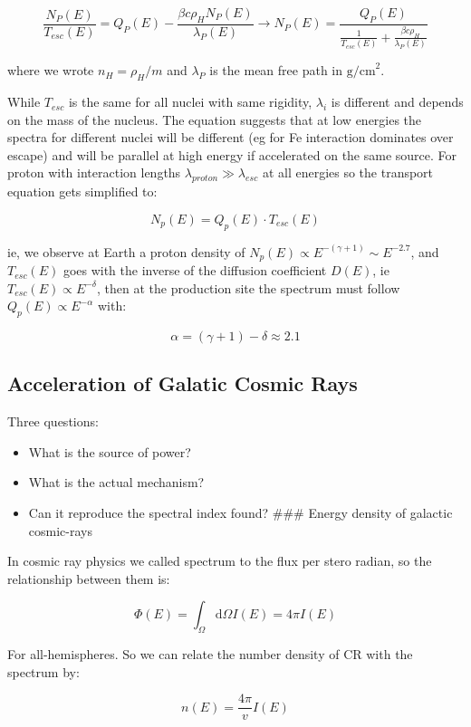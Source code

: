 \documentclass[
  letterpaper,
  DIV=11,
  numbers=noendperiod]{scrreprt}
\providecommand{\tightlist}{%
  \setlength{\itemsep}{0pt}\setlength{\parskip}{0pt}}\usepackage{longtable,booktabs,array}
\begin{document}
\[\frac{N_P(E)}{T_{esc}(E)} = Q_P(E) - \frac{\beta c \rho_H N_P(E)}{\lambda_P(E)} \rightarrow N_P(E) = \frac{Q_P(E)}{\frac{1}{T_{esc}(E)}+\frac{\beta c \rho_H}{\lambda_P(E)}}\]

where we wrote \(n_H = \rho_H/m\) and \(\lambda_P\) is the mean free
path in \(\mathrm{ g / cm}^2\).

While \(T_{esc}\) is the same for all nuclei with same rigidity,
\(\lambda_i\) is different and depends on the mass of the nucleus. The
equation suggests that at low energies the spectra for different nuclei
will be different (eg for Fe interaction dominates over escape) and will
be parallel at high energy if accelerated on the same source. For proton
with interaction lengths \(\lambda_{proton} \gg \lambda_{esc}\) at all
energies so the transport equation gets simplified to:

\[N_{p}(E) = Q_p(E)\cdot T_{esc}(E)\]

ie, we observe at Earth a proton density of
\(N_p(E)\propto E^{-(\gamma +1)} \sim E^{-2.7}\), and \(T_{esc}(E)\)
goes with the inverse of the diffusion coefficient \(D(E)\), ie
\(T_{esc}(E) \propto E^{-\delta}\), then at the production site the
spectrum must follow \(Q_p(E) \propto E^{-\alpha}\) with:

\[\alpha = (\gamma + 1) -\delta \approx 2.1\]

\subsection{Acceleration of Galatic Cosmic
Rays}\label{acceleration-of-galatic-cosmic-rays}

Three questions:

\begin{itemize}
\tightlist
\item
  What is the source of power?
\item
  What is the actual mechanism?
\item
  Can it reproduce the spectral index found? \#\#\# Energy density of
  galactic cosmic-rays
\end{itemize}

In cosmic ray physics we called spectrum to the flux per stero radian,
so the relationship between them is:

\[\Phi (E) = \int_\Omega \mathrm{ d} \Omega I(E) = 4\pi I(E)\]

For all-hemispheres. So we can relate the number density of CR with the
spectrum by:

\[n(E) = \frac{4\pi}{v}I(E)\]
\end{document}
